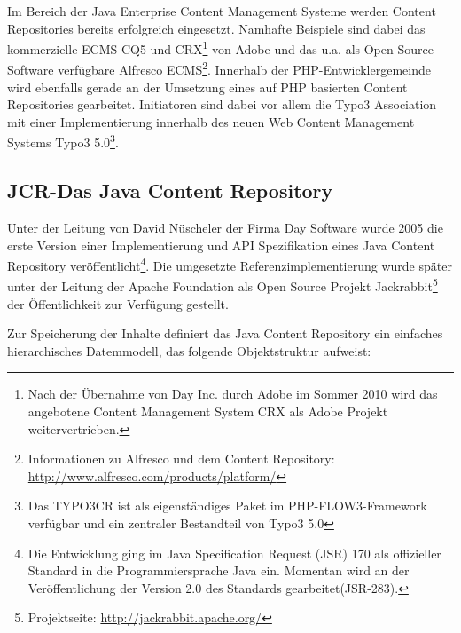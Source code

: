 Im Bereich der Java Enterprise Content Management Systeme werden Content Repositories bereits erfolgreich eingesetzt. Namhafte Beispiele sind dabei das kommerzielle ECMS CQ5 und CRX\footnote{Nach der Übernahme von Day Inc. durch Adobe im Sommer 2010 wird das angebotene Content Management System CRX als Adobe Projekt weitervertrieben.} von Adobe und das u.a. als Open Source Software verfügbare Alfresco ECMS\footnote{Informationen zu Alfresco und dem Content Repository: \href{http://www.alfresco.com/products/platform/}{http://www.alfresco.com/products/platform/}}.
Innerhalb der PHP-Entwicklergemeinde wird ebenfalls gerade an der Umsetzung eines auf PHP basierten Content Repositories gearbeitet. Initiatoren sind dabei vor allem die Typo3 Association mit einer Implementierung innerhalb des neuen Web Content Management Systems Typo3 5.0\footnote{Das TYPO3CR ist als eigenständiges Paket im PHP-FLOW3-Framework verfügbar und ein zentraler Bestandteil von Typo3 5.0}.


\subsection{JCR-Das Java Content Repository}

Unter der Leitung von David Nüscheler der Firma Day Software wurde 2005 die erste Version einer Implementierung und API Spezifikation eines Java Content Repository veröffentlicht\footnote{Die Entwicklung ging im Java Specification Request (JSR) 170 als offizieller Standard in die Programmiersprache Java ein. Momentan wird an der Veröffentlichung der Version 2.0 des Standards gearbeitet(JSR-283).}. Die umgesetzte Referenzimplementierung wurde später unter der Leitung der Apache Foundation als Open Source Projekt Jackrabbit\footnote{Projektseite: \href{http://jackrabbit.apache.org/}{http://jackrabbit.apache.org/}} der Öffentlichkeit zur Verfügung gestellt.

Zur Speicherung der Inhalte definiert das Java Content Repository ein einfaches hierarchisches Datemmodell, das folgende Objektstruktur aufweist:


